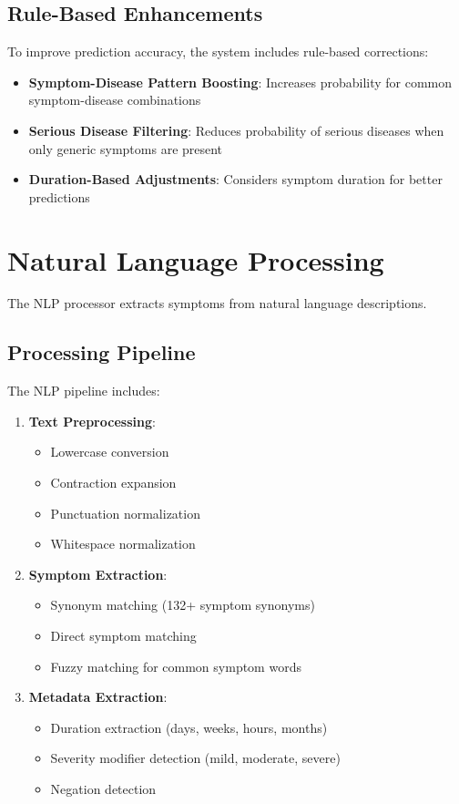 \subsection{Rule-Based Enhancements}
To improve prediction accuracy, the system includes rule-based corrections:

\begin{itemize}
    \item \textbf{Symptom-Disease Pattern Boosting}: Increases probability for common symptom-disease combinations
    \item \textbf{Serious Disease Filtering}: Reduces probability of serious diseases when only generic symptoms are present
    \item \textbf{Duration-Based Adjustments}: Considers symptom duration for better predictions
\end{itemize}

\section{Natural Language Processing}
The NLP processor extracts symptoms from natural language descriptions.

\subsection{Processing Pipeline}
The NLP pipeline includes:

\begin{enumerate}
    \item \textbf{Text Preprocessing}:
    \begin{itemize}
        \item Lowercase conversion
        \item Contraction expansion
        \item Punctuation normalization
        \item Whitespace normalization
    \end{itemize}
    
    \item \textbf{Symptom Extraction}:
    \begin{itemize}
        \item Synonym matching (132+ symptom synonyms)
        \item Direct symptom matching
        \item Fuzzy matching for common symptom words
    \end{itemize}
    
    \item \textbf{Metadata Extraction}:
    \begin{itemize}
        \item Duration extraction (days, weeks, hours, months)
        \item Severity modifier detection (mild, moderate, severe)
        \item Negation detection
    \end{itemize}
\end{enumerate}

